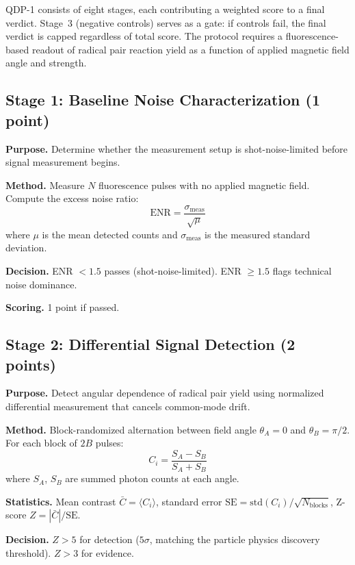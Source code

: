 \documentclass[preprint,amsmath,amssymb]{revtex4-2}
\begin{document}
QDP-1 consists of eight stages, each contributing a weighted score to a final verdict. Stage~3 (negative controls) serves as a gate: if controls fail, the final verdict is capped regardless of total score. The protocol requires a fluorescence-based readout of radical pair reaction yield as a function of applied magnetic field angle and strength.

\subsection{Stage 1: Baseline Noise Characterization (1 point)}

\textbf{Purpose.} Determine whether the measurement setup is shot-noise-limited before signal measurement begins.

\textbf{Method.} Measure $N$ fluorescence pulses with no applied magnetic field. Compute the excess noise ratio:
\begin{equation}
\text{ENR} = \frac{\sigma_\text{meas}}{\sqrt{\mu}}
\end{equation}
where $\mu$ is the mean detected counts and $\sigma_\text{meas}$ is the measured standard deviation.

\textbf{Decision.} ENR $< 1.5$ passes (shot-noise-limited). ENR $\geq 1.5$ flags technical noise dominance.

\textbf{Scoring.} 1 point if passed.

\subsection{Stage 2: Differential Signal Detection (2 points)}

\textbf{Purpose.} Detect angular dependence of radical pair yield using normalized differential measurement that cancels common-mode drift.

\textbf{Method.} Block-randomized alternation between field angle $\theta_A = 0$ and $\theta_B = \pi/2$. For each block of $2B$ pulses:
\begin{equation}
C_i = \frac{S_A - S_B}{S_A + S_B}
\end{equation}
where $S_A$, $S_B$ are summed photon counts at each angle.

\textbf{Statistics.} Mean contrast $\bar{C} = \langle C_i \rangle$, standard error $\text{SE} = \text{std}(C_i) / \sqrt{N_\text{blocks}}$, Z-score $Z = |\bar{C}| / \text{SE}$.

\textbf{Decision.} $Z > 5$ for detection ($5\sigma$, matching the particle physics discovery threshold). $Z > 3$ for evidence.
\end{document}
